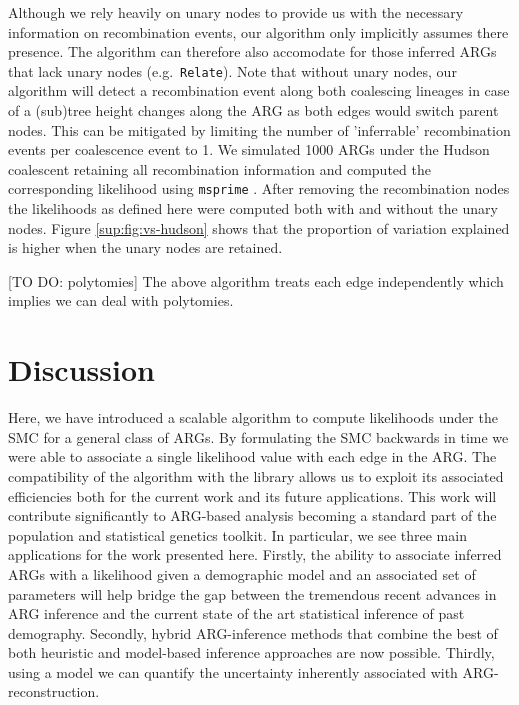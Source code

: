 \documentclass{article}
\newcommand{\relate}[0]{\texttt{Relate}}
\begin{document}
Although we rely heavily on unary nodes to provide us with the necessary 
information on recombination events, our algorithm only implicitly assumes there presence.
The algorithm can therefore also accomodate for 
those inferred ARGs that lack unary nodes (e.g.\ \relate). 
Note that without unary nodes, our algorithm will detect a recombination event along 
both coalescing lineages in case of a (sub)tree height changes along the ARG as both 
edges would switch parent nodes. This can be mitigated by limiting the number of 
'inferrable' recombination events per coalescence event to 1.
We simulated 1000 ARGs under the Hudson coalescent retaining all recombination information 
and computed the corresponding likelihood using \texttt{msprime} \citep{baumdicker_efficient_2021}. 
After removing the recombination nodes the likelihoods as defined here were computed both with and 
without the unary nodes. Figure \ref{sup:fig:vs-hudson} shows that the proportion of variation 
explained is higher when the unary nodes are retained.

[TO DO: polytomies] The above algorithm treats each edge independently which implies 
we can deal with polytomies.

 
\section{Discussion}

Here, we have introduced a scalable algorithm to compute likelihoods 
under the SMC for a general class of ARGs. By formulating the SMC backwards in time 
we were able to associate a single likelihood value with each edge in the ARG. 
The compatibility of the algorithm with the \tskit library allows us to 
exploit its associated efficiencies both for the current work and its future 
applications. This work will contribute significantly 
to ARG-based analysis becoming a standard part of the population 
and statistical genetics toolkit. 
In particular, we see three main applications for the work presented here. 
Firstly, the ability to associate inferred ARGs with a likelihood given a demographic 
model and an associated set of parameters will help bridge the gap between the tremendous recent 
advances in ARG inference and the current state of the art statistical inference of 
past demography. Secondly, hybrid ARG-inference methods that combine the best of both 
heuristic and model-based inference approaches are now possible.
Thirdly, using a model we can quantify the uncertainty inherently associated 
with ARG-reconstruction.
\end{document}
